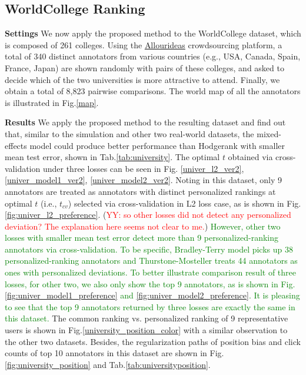\documentclass[10pt,journal,cspaper,compsoc]{IEEEtran}
\begin{document}
{\subsection{WorldCollege Ranking}

\textbf{Settings} We now apply the proposed method to the WorldCollege dataset, which is composed of 261 colleges. Using the \href{http://www.allourideas.org/}{Allourideas} crowdsourcing platform, a total of 340 distinct annotators from various countries (e.g., USA, Canada, Spain, France, Japan)
are shown randomly with pairs of these colleges, and asked to decide which of the
two universities is more attractive to attend. Finally, we obtain a
total of 8,823 pairwise comparisons. The world map of all the annotators
is illustrated in Fig.\ref{map}.

\textbf{Results} We apply the proposed method to
the resulting dataset and find out that, similar to the simulation and other two real-world datasets, the mixed-effects model could produce better performance than Hodgerank with smaller mean test error, shown in Tab.\ref{tab:university}. The optimal $t$ obtained via cross-validation under three losses can be seen in
Fig. \ref{univer_l2_ver2}, \ref{univer_model1_ver2}, \ref{univer_model2_ver2}. Noting in this dataset, only 9 annotators are treated as annotators with distinct personalized rankings at optimal $t$ (i.e., $t_{cv}$) selected via cross-validation in L2 loss case, as is shown in Fig.\ref{fig:univer_l2_preference}. (\textcolor{red}{YY: so other losses did not detect any personalized deviation? The explanation here seems not clear to me.}) \textcolor{green}{
However, other two losses with smaller mean test error detect more than 9 personalized-ranking annotators via cross-validation. To be specific, Bradley-Terry model picks up 38 personalized-ranking annotators and Thurstone-Mosteller treats 44 annotators as ones with personalized deviations.
To better illustrate comparison result of three losses, for other two, we also only show the top 9 annotators, as is shown in Fig.\ref{fig:univer_model1_preference} and \ref{fig:univer_model2_preference}. It is pleasing to see that the top 9 annotators returned by three losses are exactly the same in this dataset.}
The common ranking vs. personalized ranking of 9 representative users is shown in Fig.\ref{university_position_color} with a similar observation to the other two datasets.
Besides, the regularization paths of position bias and click counts of top 10 annotators in this dataset are shown in Fig.\ref{fig:university_position} and Tab.\ref{tab:universityposition}.
}
\end{document}

